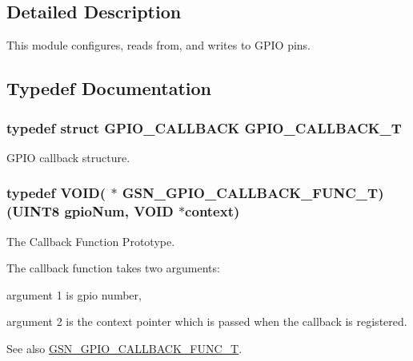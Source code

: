 \subsection{Detailed Description}
This module configures, reads from, and writes to GPIO pins. 

\subsection{Typedef Documentation}
\hypertarget{a00648_ga8646a0bb88c00e7b2463984ae3466ac7}{
\subsubsection[{GPIO\_\-CALLBACK\_\-T}]{\setlength{\rightskip}{0pt plus 5cm}typedef struct {\bf GPIO\_\-CALLBACK}  {\bf GPIO\_\-CALLBACK\_\-T}}}
\label{a00648_ga8646a0bb88c00e7b2463984ae3466ac7}


GPIO callback structure. 

\hypertarget{a00648_gae6698a8151cd85d7dac2358199ed7c6e}{
\subsubsection[{GSN\_\-GPIO\_\-CALLBACK\_\-FUNC\_\-T}]{\setlength{\rightskip}{0pt plus 5cm}typedef VOID( $\ast$  {\bf GSN\_\-GPIO\_\-CALLBACK\_\-FUNC\_\-T})({\bf UINT8} gpioNum, VOID $\ast$context)}}
\label{a00648_gae6698a8151cd85d7dac2358199ed7c6e}


The Callback Function Prototype. 

The callback function takes two arguments:
\begin{DoxyItemize}
\item argument 1 is gpio number,
\item argument 2 is the context pointer which is passed when the callback is registered. \begin{DoxySeeAlso}{See also}
\hyperlink{a00648_gae6698a8151cd85d7dac2358199ed7c6e}{GSN\_\-GPIO\_\-CALLBACK\_\-FUNC\_\-T}. 
\end{DoxySeeAlso}

\end{DoxyItemize}

